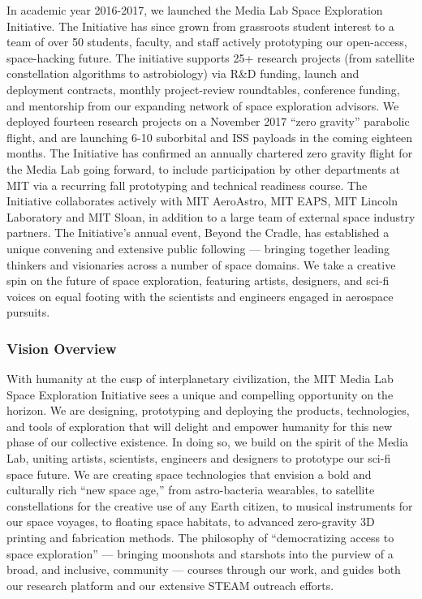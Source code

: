 In academic year 2016-2017, we launched the Media Lab Space Exploration Initiative. The Initiative has since grown from grassroots student interest to a team of over 50 students, faculty, and staff actively prototyping our open-access, space-hacking future. The initiative supports 25+ research projects (from satellite constellation algorithms to astrobiology) via R\&D funding, launch and deployment contracts, monthly project-review roundtables, conference funding, and mentorship from our expanding network of space exploration advisors. We deployed fourteen research projects on a November 2017 ``zero gravity'' parabolic flight, and are launching 6-10 suborbital and \ac{ISS} payloads in the coming eighteen  months. The Initiative has confirmed an annually chartered zero gravity flight for the Media Lab going forward, to include participation by other departments at MIT via a recurring fall prototyping and technical readiness course. The Initiative collaborates actively with MIT \ac{AeroAstro}, MIT \ac{EAPS}, MIT Lincoln Laboratory and MIT Sloan, in addition to a large team of external space industry partners. The Initiative's annual event, Beyond the Cradle, has established a unique convening and extensive public following --- bringing together leading thinkers and visionaries across a number of space domains. We take a creative spin on the future of space exploration, featuring artists, designers, and sci-fi voices on equal footing with the scientists and engineers engaged in aerospace pursuits.

\subsubsection{Vision Overview}

With humanity at the cusp of interplanetary civilization, the MIT Media Lab Space Exploration Initiative sees a unique and compelling opportunity on the horizon. We are designing, prototyping and deploying the products, technologies, and tools of exploration that will delight and empower humanity for this new phase of our collective existence. In doing so, we build on the spirit of the Media Lab, uniting artists, scientists, engineers and designers to prototype our sci-fi space future. We are creating space technologies that envision a bold and culturally rich ``new space age,'' from astro-bacteria wearables, to satellite constellations for the creative use of any Earth citizen, to musical instruments for our space voyages, to floating space habitats, to advanced zero-gravity 3D printing and fabrication methods. The philosophy of ``democratizing access to space exploration'' --- bringing moonshots and starshots into the purview of a broad, and inclusive, community --- courses through our work, and guides both our research platform and our extensive \ac{STEAM} outreach efforts.

